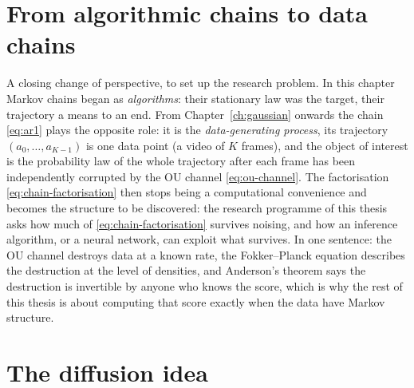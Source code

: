\section{From algorithmic chains to data chains}

A closing change of perspective, to set up the research problem. In this
chapter Markov chains began as \emph{algorithms}: their stationary law
was the target, their trajectory a means to an end. From
Chapter~\ref{ch:gaussian} onwards the chain \eqref{eq:ar1} plays the
opposite role: it is the \emph{data-generating process}, its trajectory
$(a_0, \dots, a_{K-1})$ is one data point (a video of $K$ frames), and
the object of interest is the probability law of the whole trajectory
after each frame has been independently corrupted by the OU channel
\eqref{eq:ou-channel}. The factorisation \eqref{eq:chain-factorisation}
then stops being a computational convenience and becomes the structure to
be discovered: the research programme of this thesis asks how much of
\eqref{eq:chain-factorisation} survives noising, and how an inference
algorithm, or a neural network, can exploit what survives. In one
sentence: the OU channel destroys data at a known rate, the
Fokker--Planck equation describes the destruction at the level of
densities, and Anderson's theorem says the destruction is invertible by
anyone who knows the score, which is why the rest of this thesis is about
computing that score exactly when the data have Markov structure.
\section{The diffusion idea}\label{sec:diffusion-idea}


